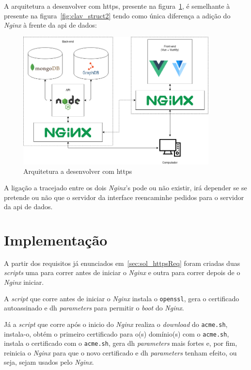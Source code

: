 A arquitetura a desenvolver com \acrshort{https}, presente na figura~\ref{fig:apiHttpsArch}, é semelhante à presente na figura~\ref{fig:clav_struct2} tendo como única diferença a adição do \textit{Nginx} à frente da \acrshort{api} de dados:
\begin{figure}[H]
    \centering
    \includegraphics[width=0.9\textwidth]{img/apiHttpsArch.png}
    \caption{Arquitetura a desenvolver com \acrshort{https}\label{fig:apiHttpsArch}}
\end{figure}

A ligação a tracejado entre os dois \textit{Nginx}'s pode ou não existir, irá depender se se pretende ou não que o servidor da interface reencaminhe pedidos para o servidor da \acrshort{api} de dados.

\section{Implementação}

A partir dos requisitos já enunciados em~\ref{sec:sol_httpsReq} foram criadas duas \textit{scripts} uma para correr antes de iniciar o \textit{Nginx} e outra para correr depois de o \textit{Nginx} iniciar.

A \textit{script} que corre antes de iniciar o \textit{Nginx} instala o \texttt{openssl}, gera o certificado autoassinado e \acrshort{dh} \textit{parameters} para permitir o \textit{boot} do \textit{Nginx}.

Já a \textit{script} que corre após o inicio do \textit{Nginx} realiza o \textit{download} do \texttt{acme.sh}, instala-o, obtém o primeiro certificado para o(s) domínio(s) com o \texttt{acme.sh}, instala o certificado com o \texttt{acme.sh}, gera \acrshort{dh} \textit{parameters} mais fortes e, por fim, reinicia o \textit{Nginx} para que o novo certificado e \acrshort{dh} \textit{parameters} tenham efeito, ou seja, sejam usados pelo \textit{Nginx}.

